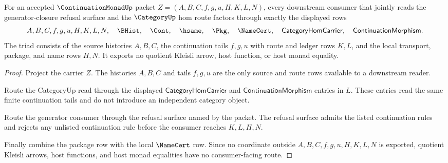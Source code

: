 \begin{theorem}
\label{thm:continuation-monad-generator-category-consumer-triad}
For an accepted $\ContinuationMonadUp$ packet
$Z=(A,B,C,f,g,u,H,K,L,N)$, every downstream consumer that jointly reads the
generator-closure refusal surface and the $\CategoryUp$ hom route factors
through exactly the displayed rows
$$
A,B,C,f,g,u,H,K,L,N,\quad \BHist,\quad \Cont,\quad \hsame,\quad \Pkg,\quad
\NameCert,\quad \mathsf{CategoryHomCarrier},\quad
\mathsf{ContinuationMorphism}.
$$
The triad consists of the source histories $A,B,C$, the continuation tails
$f,g,u$ with route and ledger rows $K,L$, and the local transport, package, and
name rows $H,N$. It exports no quotient Kleisli arrow, host function, or host
monad equality.
\end{theorem}
\begin{proof}
Project the carrier $Z$. The histories $A,B,C$ and tails $f,g,u$ are the only
source and route rows available to a downstream reader.

Route the CategoryUp read through the displayed
$\mathsf{CategoryHomCarrier}$ and $\mathsf{ContinuationMorphism}$ entries in
$L$. These entries read the same finite continuation tails and do not introduce
an independent category object.

Route the generator consumer through the refusal surface named by the packet.
The refusal surface admits the listed continuation rules and rejects any
unlisted continuation rule before the consumer reaches $K,L,H,N$.

Finally combine the package row with the local $\NameCert$ row. Since no
coordinate outside $A,B,C,f,g,u,H,K,L,N$ is exported, quotient Kleisli arrows,
host functions, and host monad equalities have no consumer-facing route.
\end{proof}

